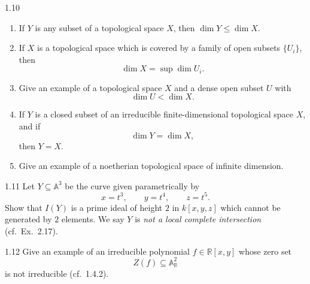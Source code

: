 \documentclass[12pt]{article}
\begin{document}
\begin{problem}{1.10}
\begin{enumerate}
    \item[(a)] If $Y$ is any subset of a topological space $X$, then $\dim Y\leq \dim X$.

    \item[(b)] If $X$ is a topological space which is covered by a family of open subsets $\{U_i\}$, then
    \[
    \dim X=\sup \dim U_i.
    \]

    \item[(c)] Give an example of a topological space $X$ and a dense open subset $U$ with
    \[
    \dim U<\dim X.
    \]

    \item[(d)] If $Y$ is a closed subset of an irreducible finite-dimensional topological space $X$, and if
    \[
    \dim Y=\dim X,
    \]
    then $Y=X$.

    \item[(e)] Give an example of a noetherian topological space of infinite dimension.
\end{enumerate}
\end{problem}

\begin{problem}{1.11}
Let $Y\subseteq \mathbb A^3$ be the curve given parametrically by
\[
x=t^3,\qquad y=t^4,\qquad z=t^5.
\]
Show that $I(Y)$ is a prime ideal of height $2$ in $k[x,y,z]$ which cannot be generated by $2$ elements. We say $Y$ is \emph{not a local complete intersection} (cf.\ Ex.\ 2.17).
\end{problem}

\begin{problem}{1.12}
Give an example of an irreducible polynomial $f\in \mathbb R[x,y]$ whose zero set
\[
Z(f)\subseteq \mathbb A^2_{\mathbb R}
\]
is not irreducible (cf.\ 1.4.2).
\end{problem}
\end{document}
